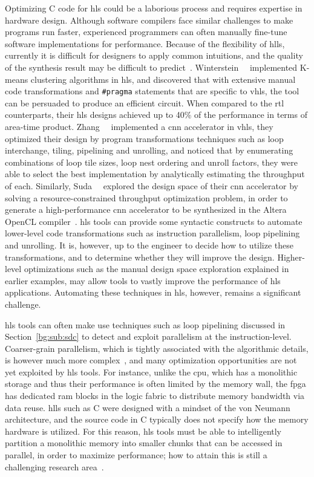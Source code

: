 Optimizing C code for \gls{hls} could be a laborious process and requires
expertise in hardware design.  Although software compilers face similar
challenges to make programs run faster, experienced programmers can often
manually fine-tune software implementations for performance.  Because of
the flexibility of \glspl{hll}, currently it is difficult for designers
to apply common intuitions, and the quality of the synthesis result may
be difficult to predict~\cite{gupta04}.  Winterstein~\etal~\cite{felix13}
implemented K-means clustering algorithms in \gls{hls}, and discovered that
with extensive manual code transformations and \verb|#pragma| statements
that are specific to \gls{vhls}, the tool can be persuaded to produce an
efficient circuit.  When compared to the \gls{rtl} counterparts, their
\gls{hls} designs achieved up to 40\% of the performance in terms of area-time
product.  Zhang~\etal~\cite{zhang15} implemented a \gls{cnn} accelerator in
\gls{vhls}, they optimized their design by program transformations techniques
such as loop interchange, tiling, pipelining and unrolling, and noticed that
by enumerating combinations of loop tile sizes, loop nest ordering and unroll
factors, they were able to select the best implementation by analytically
estimating the throughput of each.  Similarly, Suda~\etal~\cite{suda16}
explored the design space of their \gls{cnn} accelerator by solving a
resource-constrained throughput optimization problem, in order to generate a
high-performance \gls{cnn} accelerator to be synthesized in the Altera OpenCL
compiler~\cite{aoc}.  \Gls{hls} tools can provide some syntactic constructs
to automate lower-level code transformations such as instruction parallelism,
loop pipelining and unrolling.  It is, however, up to the engineer to decide
how to utilize these transformations, and to determine whether they will
improve the design.  Higher-level optimizations such as the manual design space
exploration explained in earlier examples, may allow tools to vastly improve
the performance of \gls{hls} applications.  Automating these techniques in
\gls{hls}, however, remains a significant challenge.

\Gls{hls} tools can often make use techniques such as loop pipelining
discussed in Section~\ref{bg:sub:sdc} to detect and exploit parallelism at the
instruction-level.  Coarser-grain parallelism, which is tightly associated
with the algorithmic details, is however much more complex~\cite{nane15}, and
many optimization opportunities are not yet exploited by \gls{hls} tools.  For
instance, unlike the \gls{cpu}, which has a monolithic storage and thus their
performance is often limited by the memory wall, the \gls{fpga} has dedicated
\gls{ram} blocks in the logic fabric to distribute memory bandwidth via data
reuse. \glspl{hll} such as C were designed with a mindset of the von Neumann
architecture, and the source code in C typically does not specify how the
memory hardware is utilized.  For this reason, \gls{hls} tools must be able to
intelligently partition a monolithic memory into smaller chunks that can be
accessed in parallel, in order to maximize performance; how to attain this is
still a challenging research area~\cite{cong11, cong12, wang13, felix15}.

